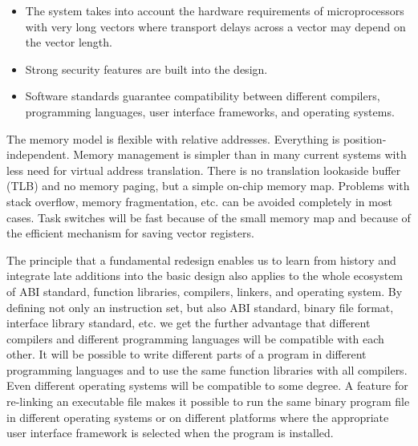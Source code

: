 \documentclass[forwardcom.tex]{subfiles}
\begin{document}
\begin{itemize}
\item The system takes into account the hardware requirements of microprocessors with very long vectors where transport delays across a vector may depend on the vector length.

\item Strong security features are built into the design.

\item Software standards guarantee compatibility between different compilers, programming languages, user interface frameworks, and operating systems.

\end{itemize}

The memory model is flexible with relative addresses. Everything is position-independent. Memory management is simpler than in many current systems with less need for virtual address translation. There is no translation lookaside buffer (TLB) and no memory paging, but a simple on-chip memory map. Problems with stack overflow, memory fragmentation, etc. can be avoided completely in most cases. Task switches will be fast because of the small memory map and because of the efficient mechanism for saving vector registers. 
\vspace{2mm}

The principle that a fundamental redesign enables us to learn from history and integrate late additions into the basic design also applies to the whole ecosystem of ABI standard, function libraries, compilers, linkers, and operating system. By defining not only an instruction set, but also ABI standard, binary file format, interface library standard, etc. we get the further advantage that different compilers and different programming languages will be compatible with each other. It will be possible to write different parts of a program in different programming languages and to use the same function libraries with all compilers. Even different operating systems will be compatible to some degree. A feature for re-linking an executable file makes it possible to run the same binary program file in different operating systems or on different platforms where the appropriate user interface framework is selected when the program is installed.
\vspace{2mm}
\end{document}
